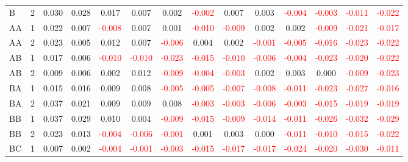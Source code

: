 \begin{table}[H]
{\begin{tabular}{llcccccccccccc}
B & 2 & 0.030 & 0.028 & 0.017 & 0.007 & 0.002 & \textcolor{red}{-0.002} & 0.007 & 0.003 & \textcolor{red}{-0.004} & \textcolor{red}{-0.003} & \textcolor{red}{-0.011} & \textcolor{red}{-0.022}\\
AA & 1 & 0.022 & 0.007 & \textcolor{red}{-0.008} & 0.007 & 0.001 & \textcolor{red}{-0.010} & \textcolor{red}{-0.009} & 0.002 & 0.002 & \textcolor{red}{-0.009} & \textcolor{red}{-0.021} & \textcolor{red}{-0.017}\\
AA & 2 & 0.023 & 0.005 & 0.012 & 0.007 & \textcolor{red}{-0.006} & 0.004 & 0.002 & \textcolor{red}{-0.001} & \textcolor{red}{-0.005} & \textcolor{red}{-0.016} & \textcolor{red}{-0.023} & \textcolor{red}{-0.022}\\
AB & 1 & 0.017 & 0.006 & \textcolor{red}{-0.010} & \textcolor{red}{-0.010} & \textcolor{red}{-0.023} & \textcolor{red}{-0.015} & \textcolor{red}{-0.010} & \textcolor{red}{-0.006} & \textcolor{red}{-0.004} & \textcolor{red}{-0.023} & \textcolor{red}{-0.020} & \textcolor{red}{-0.022}\\
AB & 2 & 0.009 & 0.006 & 0.002 & 0.012 & \textcolor{red}{-0.009} & \textcolor{red}{-0.004} & \textcolor{red}{-0.003} & 0.002 & 0.003 & 0.000 & \textcolor{red}{-0.009} & \textcolor{red}{-0.023}\\
BA & 1 & 0.015 & 0.016 & 0.009 & 0.008 & \textcolor{red}{-0.005} & \textcolor{red}{-0.005} & \textcolor{red}{-0.007} & \textcolor{red}{-0.008} & \textcolor{red}{-0.011} & \textcolor{red}{-0.023} & \textcolor{red}{-0.027} & \textcolor{red}{-0.016}\\
BA & 2 & 0.037 & 0.021 & 0.009 & 0.009 & 0.008 & \textcolor{red}{-0.003} & \textcolor{red}{-0.003} & \textcolor{red}{-0.006} & \textcolor{red}{-0.003} & \textcolor{red}{-0.015} & \textcolor{red}{-0.019} & \textcolor{red}{-0.019}\\
BB & 1 & 0.037 & 0.029 & 0.010 & 0.004 & \textcolor{red}{-0.009} & \textcolor{red}{-0.015} & \textcolor{red}{-0.009} & \textcolor{red}{-0.014} & \textcolor{red}{-0.011} & \textcolor{red}{-0.026} & \textcolor{red}{-0.032} & \textcolor{red}{-0.029}\\
BB & 2 & 0.023 & 0.013 & \textcolor{red}{-0.004} & \textcolor{red}{-0.006} & \textcolor{red}{-0.001} & 0.001 & 0.003 & 0.000 & \textcolor{red}{-0.011} & \textcolor{red}{-0.010} & \textcolor{red}{-0.015} & \textcolor{red}{-0.022}\\
BC & 1 & 0.007 & 0.002 & \textcolor{red}{-0.004} & \textcolor{red}{-0.001} & \textcolor{red}{-0.003} & \textcolor{red}{-0.015} & \textcolor{red}{-0.017} & \textcolor{red}{-0.017} & \textcolor{red}{-0.024} & \textcolor{red}{-0.020} & \textcolor{red}{-0.030} & \textcolor{red}{-0.011}\\

\end{tabular}}
\end{table}
